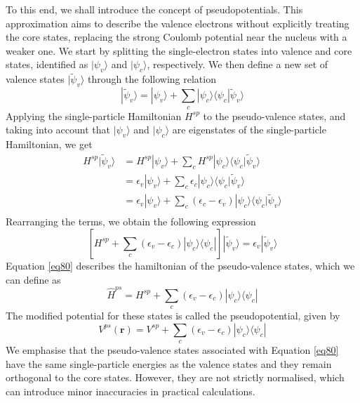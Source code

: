 To this end, we shall introduce the concept of pseudopotentials\supercite{Hellmann1935}.
This approximation aims to describe the valence electrons without explicitly treating 
the core states, replacing the strong Coulomb potential near the nucleus with a 
weaker one. We start by splitting the single-electron states into valence and 
core states, identified as $|\psi_{v}\rangle$ and $|\psi_{c}\rangle$, respectively. We then define 
a new set of valence states $|\tilde{\psi}_{v}\rangle$  through the following 
relation 
\begin{equation}
    \label{eq78}
    |\tilde{\psi}_{v}\rangle = |\psi_{v}\rangle + \sum_{c} |\psi_{c}\rangle 
    \langle \psi_{c} |\tilde{\psi}_{v}\rangle
\end{equation}
Applying the single-particle Hamiltonian $H^{sp}$ to the pseudo-valence states,
and taking into account that $|\psi_{v}\rangle$ and $|\psi_{c}\rangle$ are eigenstates of the
single-particle Hamiltonian, we get
\begin{equation}
    \label{eq79}
    \begin{aligned}
    H^{sp} |\tilde{\psi}_{v}\rangle &= H^{sp}|\psi_{v}\rangle  + 
    \sum_{c} H^{sp}|\psi_{c}\rangle \langle \psi_{c} |\tilde{\psi}_{v}\rangle\\
    &= \epsilon_{v} |\psi_{v}\rangle + \sum_{c} \epsilon_{c} |\psi_{c}\rangle
    \langle \psi_{c} |\tilde{\psi}_{v}\rangle\\
    &= \epsilon_{v} |\psi_{v}\rangle + \sum_{c} (\epsilon_{c} - \epsilon_{v}) |\psi_{c}\rangle
    \langle \psi_{c} |\tilde{\psi}_{v}\rangle\\
    \end{aligned}
\end{equation}
Rearranging the terms, we obtain the following expression
\begin{equation}
    \label{eq80}
    \left[H^{sp} + \sum_{c} (\epsilon_{v} - \epsilon_{c})|\psi_{c}\rangle \langle \psi_{c} | \right] 
    |\tilde{\psi}_{v}\rangle = \epsilon_{v} |\tilde{\psi}_{v}\rangle
\end{equation}
Equation \ref{eq80} describes the hamiltonian of the pseudo-valence states,
which we can define as 
\begin{equation}
    \label{eq81}
    \hat{H}^{ps} = H^{sp} + \sum_{c} (\epsilon_{v} - \epsilon_{c})|\psi_{c}\rangle \langle \psi_{c} |
\end{equation}
The modified potential for these states is called the pseudopotential, given 
by 
\begin{equation}
    \label{eq82}
    V^{ps}(\mathbf{r}) = V^{sp} + \sum_{c} (\epsilon_{v} - \epsilon_{c})|\psi_{c}\rangle \langle \psi_{c} |
\end{equation}
We emphasise that the pseudo-valence states associated with 
Equation \ref{eq80} have the same single-particle energies as the valence states and they remain 
orthogonal to the core states. However, they are not strictly normalised, which can introduce 
minor inaccuracies in practical calculations. 

